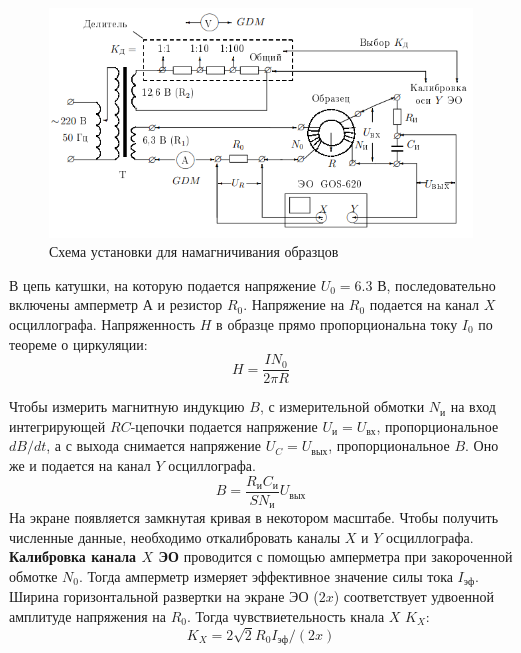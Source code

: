 \begin{figure}[h!]
    \centering 
    \includegraphics[width=15cm]{images/setup.png}
    \caption{Схема установки для намагничивания образцов}
\end{figure}

\indent В цепь катушки, на которую подается напряжение $U_0 = 6.3$ В, последовательно включены амперметр А и резистор $R_0$. Напряжение на $R_0$ подается на канал $X$ осциллографа. Напряженность $H$ в образце прямо пропорциональна току $I_0$ по теореме о циркуляции: 
\begin{equation}
    H = \frac{IN_0}{2\pi R} \label{eq:H}
\end{equation}

\indent Чтобы измерить магнитную индукцию $B$, с измерительной обмотки $N_и$ на вход интегрирующей $RC$-цепочки подается напряжение $U_и = U_{\text{вх}}$, пропорциональное $dB/dt$, а с выхода снимается напряжение $U_C = U_{\text{вых}}$, пропорциональное $B$. Оно же и подается на канал $Y$ осциллографа.
\begin{equation}
    B = \frac{R_{\text{и}}C_{\text{и}}}{S N_{\text{и}}}U_{\text{вых}} \label{eq:B}
\end{equation}
\indent На экране появляется замкнутая кривая в некотором масштабе. Чтобы получить численные данные, необходимо откалибровать каналы $X$ и $Y$ осциллографа.\\
\indent \textbf{Калибровка канала $X$ ЭО} проводится с помощью амперметра при закороченной обмотке $N_0$. Тогда амперметр измеряет эффективное значение силы тока $I_{\text{эф}}$. Ширина горизонтальной развертки на экране  ЭО ($2x$) соответствует удвоенной амплитуде напряжения на $R_0$. Тогда чувствиетельность кнала $X$ $K_X$:
\begin{equation}
    K_X = 2\sqrt{2}R_0 I_{\text{эф}}/(2x) \label{eq:Kx}
\end{equation}

